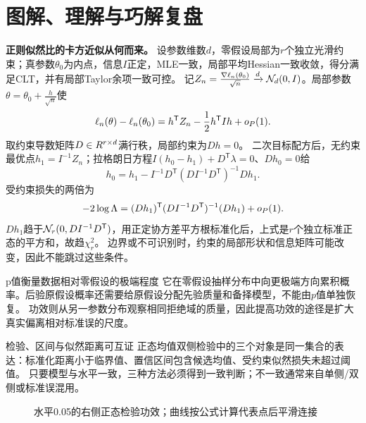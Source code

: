 \section*{图解、理解与巧解复盘}
\begin{extension}
\textbf{正则似然比的卡方近似从何而来。}
设参数维数$d$，零假设局部为$r$个独立光滑约束；真参数$\theta_0$为内点，信息$I$正定，MLE一致，局部平均Hessian一致收敛，得分满足CLT，并有局部Taylor余项一致可控。
记$Z_n=\frac{\nabla\ell_n(\theta_0)}{\sqrt n}\xrightarrow{d}\mathcal N_d(0,I)$。局部参数$\theta=\theta_0+\frac{h}{\sqrt n}$使
\[\ell_n(\theta)-\ell_n(\theta_0)=h^\mathsf TZ_n-\dfrac12h^\mathsf TIh+o_{P}(1).\]
取约束导数矩阵$D\in R^{r\times d}$满行秩，局部约束为$Dh=0$。
二次目标配方后，无约束最优点$h_1=I^{-1}Z_n$；拉格朗日方程$I(h_0-h_1)+D^\mathsf T\lambda=0$、$Dh_0=0$给
\[h_0=h_1-I^{-1}D^\mathsf T(DI^{-1}D^\mathsf T)^{-1}Dh_1.\]
受约束损失的两倍为
\[-2\log\Lambda=(Dh_1)^\mathsf T(DI^{-1}D^\mathsf T)^{-1}(Dh_1)+o_{P}(1).\]
$Dh_1$趋于$\mathcal N_r(0,DI^{-1}D^\mathsf T)$，用正定协方差平方根标准化后，上式是$r$个独立标准正态的平方和，故趋$\chi_r^2$。
边界或不可识别时，约束的局部形状和信息矩阵可能改变，因此不能跳过这些条件。
\end{extension}
\begin{insight}{p值衡量数据相对零假设的极端程度}
它在零假设抽样分布中向更极端方向累积概率。后验原假设概率还需要给原假设分配先验质量和备择模型，不能由$p$值单独恢复。
功效则从另一参数分布观察相同拒绝域的质量，因此提高功效的途径是扩大真实偏离相对标准误的尺度。
\end{insight}
\begin{clevertrick}{检验、区间与似然距离可互证}
正态均值双侧检验中的三个对象是同一集合的表达：标准化距离小于临界值、置信区间包含候选均值、受约束似然损失未超过阈值。
只要模型与水平一致，三种方法必须得到一致判断；不一致通常来自单侧/双侧或标准误混用。
\end{clevertrick}
\begin{figure}[htbp]\centering
{}\caption{水平0.05的右侧正态检验功效；曲线按公式计算代表点后平滑连接}\label{fig:power}\end{figure}

